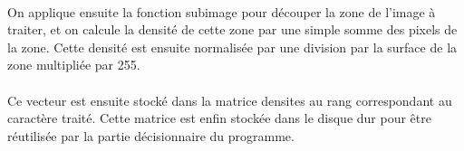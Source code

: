 \paragraph{}
On applique ensuite la fonction subimage pour découper la zone de l'image à traiter, et on calcule la densité de cette zone par une simple somme des pixels 
de la zone. Cette densité est ensuite normalisée par une division par la surface de la zone multipliée par 255.

\paragraph{}
Ce vecteur est ensuite stocké dans la matrice densites au rang correspondant au caractère traité. Cette matrice est enfin stockée dans le disque dur pour 
être réutilisée par la partie décisionnaire du programme.






